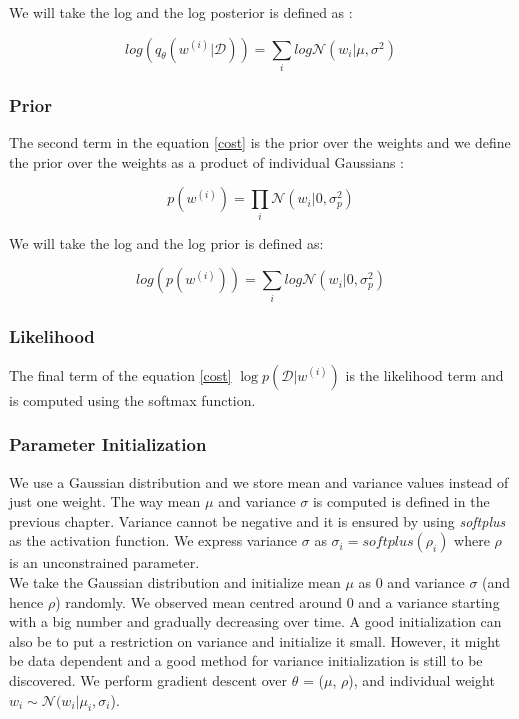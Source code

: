 We will take the log and the log posterior is defined as :

\begin{equation}
    log(q_{\theta}(w^{(i)}|\mathcal{D}))= \sum_{i}log \mathcal{N}(w_{i} | \mu,\sigma^2)
\end{equation}

\subsubsection{Prior}

The second term in the equation \eqref{cost} is the prior over the weights and we define the prior over the weights as a product of individual Gaussians :

\begin{equation}
    p(w^{(i)})= \prod_{i} \mathcal{N}(w_{i} | 0,\sigma_{p}^2)
\end{equation}

We will take the log and the log prior is defined as:

\begin{equation}
    log (p(w^{(i)}))= \sum_{i} log \mathcal{N}(w_{i} | 0,\sigma_{p}^2)
\end{equation}

\subsubsection{ Likelihood }

The final term of the equation \eqref{cost} $\log p(\mathcal{D}|w^{(i)})$ is the likelihood term and is computed using the softmax function.

\subsubsection{Parameter Initialization}

We use a Gaussian distribution and we store mean and variance values instead of just one weight. The way mean $\mu$ and variance $\sigma$ is computed is defined in the previous chapter. Variance cannot be negative and it is ensured by using \textit{softplus} as the activation function. We express variance $\sigma$ as $\sigma_{i}=softplus(\rho_{i})$ where $\rho$ is an unconstrained parameter. \\

We take the Gaussian distribution and initialize mean $\mu$ as 0 and variance $\sigma$ (and hence $\rho$) randomly. We observed mean centred around 0 and a variance starting with a big number and gradually decreasing over time. A good initialization can also be to put a restriction on variance and initialize it small. However, it might be data dependent and a good method for variance initialization is still to be discovered. We perform gradient descent over $\theta$ = ($\mu$, $\rho$), and individual weight $w_{i} \sim \mathcal{N} (w_{i} | \mu_{i}, \sigma_{i}$).  

